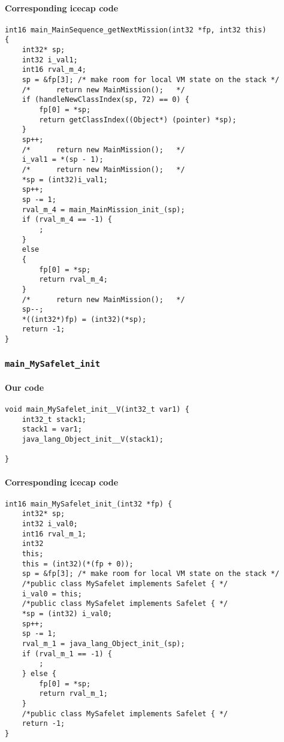 \paragraph{Corresponding icecap code}\hfill
\begin{lstlisting}[firstnumber=56227]
int16 main_MainSequence_getNextMission(int32 *fp, int32 this)
{
	int32* sp;
	int32 i_val1;
	int16 rval_m_4;
	sp = &fp[3]; /* make room for local VM state on the stack */
	/*		return new MainMission();   */
	if (handleNewClassIndex(sp, 72) == 0) {
		fp[0] = *sp;
		return getClassIndex((Object*) (pointer) *sp);
	}
	sp++;
	/*		return new MainMission();   */
	i_val1 = *(sp - 1);
	/*		return new MainMission();   */
	*sp = (int32)i_val1;
	sp++;
	sp -= 1;
	rval_m_4 = main_MainMission_init_(sp);
	if (rval_m_4 == -1) {
		;
	}
	else
	{
		fp[0] = *sp;
		return rval_m_4;
	}
	/*		return new MainMission();   */
	sp--;
	*((int32*)fp) = (int32)(*sp);
	return -1;
}
\end{lstlisting}

\subsubsection{\texttt{main\_MySafelet\_init}}

\paragraph{Our code}\hfill
\begin{lstlisting}[firstnumber=2084]
void main_MySafelet_init__V(int32_t var1) {
	int32_t stack1;
	stack1 = var1;
	java_lang_Object_init__V(stack1);

}
\end{lstlisting}

\paragraph{Corresponding icecap code}\hfill
\begin{lstlisting}[firstnumber=56276]
int16 main_MySafelet_init_(int32 *fp) {
	int32* sp;
	int32 i_val0;
	int16 rval_m_1;
	int32
	this;
	this = (int32)(*(fp + 0));
	sp = &fp[3]; /* make room for local VM state on the stack */
	/*public class MySafelet implements Safelet { */
	i_val0 = this;
	/*public class MySafelet implements Safelet { */
	*sp = (int32) i_val0;
	sp++;
	sp -= 1;
	rval_m_1 = java_lang_Object_init_(sp);
	if (rval_m_1 == -1) {
		;
	} else {
		fp[0] = *sp;
		return rval_m_1;
	}
	/*public class MySafelet implements Safelet { */
	return -1;
}
\end{lstlisting}

